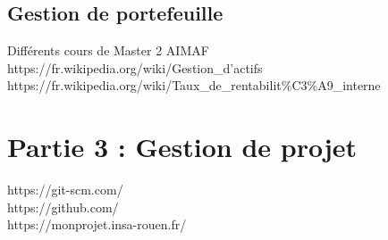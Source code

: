 \subsection{Gestion de portefeuille}
Différents cours de Master 2 AIMAF \\
https://fr.wikipedia.org/wiki/Gestion\_d'actifs \\
https://fr.wikipedia.org/wiki/Taux\_de\_rentabilit\%C3\%A9\_interne 

\section{Partie 3 : Gestion de projet}
https://git-scm.com/ \\
https://github.com/ \\
https://monprojet.insa-rouen.fr/ 

      